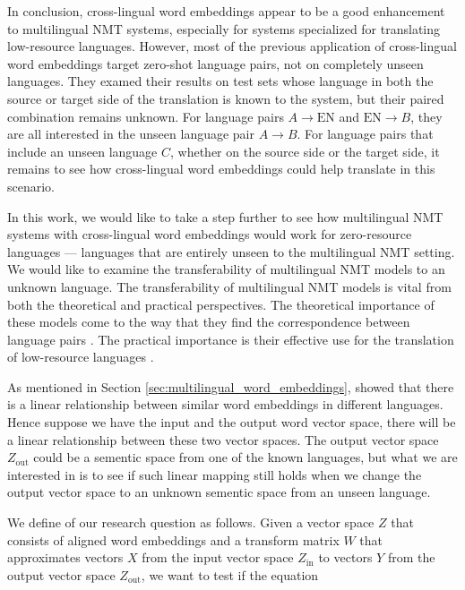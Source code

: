 \documentclass[thesis,fonts=libertine]{cluu}
\begin{document}
In conclusion, cross-lingual word embeddings appear to be a good enhancement to multilingual NMT systems, especially for systems specialized for translating low-resource languages. However, most of the previous application of cross-lingual word embeddings target zero-shot language pairs, not on completely unseen languages. They examed their results on test sets whose language in both the source or target side of the translation is known to the system, but their paired combination remains unknown. For language pairs $A \rightarrow \text{EN}$ and $\text{EN} \rightarrow B$, they are all interested in the unseen language pair $A \rightarrow B$. For language pairs that include an unseen language $C$, whether on the source side or the target side, it remains to see how cross-lingual word embeddings could help translate in this scenario.

In this work, we would like to take a step further to see how multilingual NMT systems with cross-lingual word embeddings would work for zero-resource languages --- languages that are entirely unseen to the multilingual NMT setting. We would like to examine the transferability of multilingual NMT models to an unknown language. The transferability of multilingual NMT models is vital from both the theoretical and practical perspectives. The theoretical importance of these models come to the way that they find the correspondence between language pairs \parencite{Johnson:2016aa,lu-etal-2018-neural}. The practical importance is their effective use for the translation of low-resource languages \parencite{Zoph:2016aa,Nguyen:2017aa}.

As mentioned in Section \ref{sec:multilingual_word_embeddings}, \textcite{Mikolov:2013ac} showed that there is a linear relationship between similar word embeddings in different languages. Hence suppose we have the input and the output word vector space, there will be a linear relationship between these two vector spaces. The output vector space $Z_\text{out}$ could be a sementic space from one of the known languages, but what we are interested in is to see if such linear mapping still holds when we change the output vector space to an unknown sementic space from an unseen language.

We define of our research question as follows. Given a vector space $Z$ that consists of aligned word embeddings and a transform matrix $W$ that approximates vectors $X$ from the input vector space $Z_\text{in}$ to vectors $Y$ from the output vector space $Z_\text{out}$, we want to test if the equation
\end{document}
